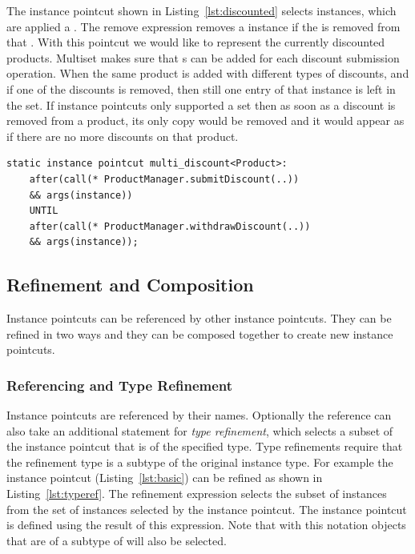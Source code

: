 The instance pointcut shown in Listing~\ref{lst:discounted} selects  instances, which are applied a . The remove expression removes a  instance if the  is removed from that . With this pointcut we would like to represent the currently discounted products. Multiset makes sure that s can be added for each discount submission operation. When the same product is added with different types of discounts, and if one of the discounts is removed, then still one entry of that instance is left in the set.  If instance pointcuts only supported a set then as soon as a discount is removed from a product, its only copy would be removed and it would appear as if there are no more discounts on that product. 

\begin{lstlisting}[float=h!, caption={An instance pointcut utilizing multiset property}, label={lst:discounted}]
static instance pointcut multi_discount<Product>: 
	after(call(* ProductManager.submitDiscount(..)) 
	&& args(instance)) 
	UNTIL 
	after(call(* ProductManager.withdrawDiscount(..)) 
	&& args(instance));
\end{lstlisting}


\subsection{Refinement and Composition}

Instance pointcuts can be referenced by other instance pointcuts. They can be refined in two ways and they can be composed together to create new instance pointcuts. 

\subsubsection{Referencing and Type Refinement}
\label{sect:typeref}
Instance pointcuts are referenced by their names. Optionally the reference can also take an additional statement for \emph{type refinement}, which selects a subset of the instance pointcut that is of the specified type. Type refinements require that the refinement type is a subtype of the original instance type. For example the instance pointcut  (Listing~\ref{lst:basic}) can be refined as shown in Listing~\ref{lst:typeref}. The refinement expression selects the subset of  instances from the set of  instances selected by the  instance pointcut. The  instance pointcut is defined using the result of this expression. Note that with this notation objects that are of a subtype of  will also be selected. 

